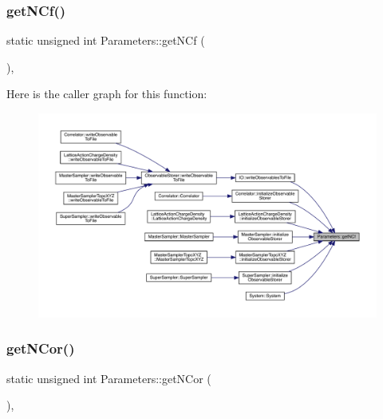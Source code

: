 \subsubsection{\texorpdfstring{getNCf()}{getNCf()}}
{\footnotesize\ttfamily static unsigned int Parameters\+::get\+N\+Cf (\begin{DoxyParamCaption}{ }\end{DoxyParamCaption})\hspace{0.3cm}{\ttfamily [inline]}, {\ttfamily [static]}}

Here is the caller graph for this function\+:\nopagebreak
\begin{figure}[H]
\begin{center}
\leavevmode
\includegraphics[width=350pt]{class_parameters_a03f8c0aa2a31b9bfc016441cb263082c_icgraph}
\end{center}
\end{figure}
\mbox{\label{class_parameters_a0fd902d5efcd8dce17dbc3ea4177820d}} 
\subsubsection{\texorpdfstring{getNCor()}{getNCor()}}
{\footnotesize\ttfamily static unsigned int Parameters\+::get\+N\+Cor (\begin{DoxyParamCaption}{ }\end{DoxyParamCaption})\hspace{0.3cm}{\ttfamily [inline]}, {\ttfamily [static]}}

